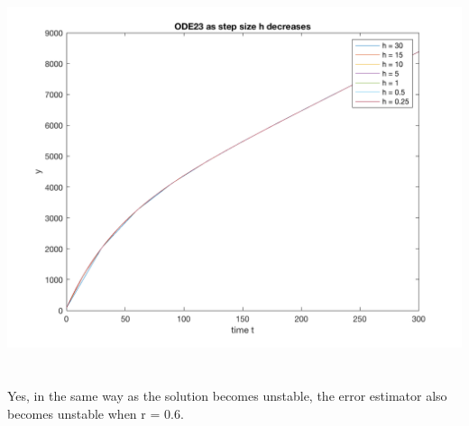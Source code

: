 \documentclass[10pt,a4paper]{article}
\begin{document}
\section{}
\includegraphics[scale=0.3]{fig_3.png}\\

\section{}

\section{}

Yes, in the same way as the solution becomes unstable, the error estimator also becomes unstable when r = 0.6.
\end{document}
